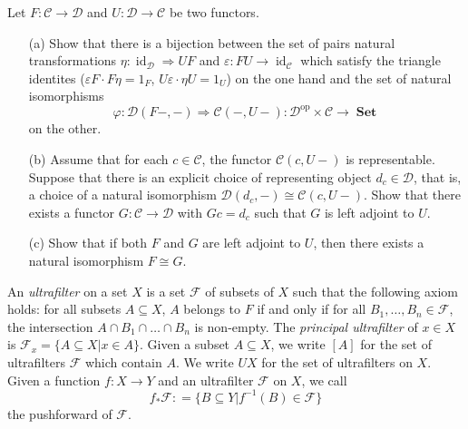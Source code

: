 \documentclass[12pt, a4paper]{article}
\DeclareMathOperator{\id}{id}
\DeclareMathOperator{\op}{op}
\DeclareMathOperator{\Set}{\mathbf{Set}}
\newcommand{\ca}[1]{\mathscr{#1}}
\newcommand{\defl}{\mathrel{\mathop:}=}
\theoremstyle{plain}
\theoremstyle{definition}
\theoremstyle{citing}
\theoremstyle{citingdfn}
\numberwithin{equation}{section}
\begin{document}
\begin{question}[subtitle=(equivalent characterizations of adjunctions)]
 Let $F \colon \ca{C} \rightarrow \ca{D}$ and $U \colon \ca{D} \rightarrow \ca{C}$ be two functors.
 
\begin{enumerate}
\item[(a)] Show that there is a bijection between the set of pairs natural transformations $\eta \colon \id_{\ca{D}} \Rightarrow UF$ and $\varepsilon \colon FU \rightarrow \id_{\ca{C}}$ which satisfy the triangle identites ($\varepsilon F \cdot F\eta=1_F$, $U \varepsilon \cdot \eta U=1_U$) on the one hand and the set of natural isomorphisms
\[
\varphi \colon \ca{D}(F-,-) \Rightarrow \ca{C}(-,U-) \colon \ca{D}^{\op} \times \ca{C} \rightarrow \Set
\]
on the other.
\item[(b)]
 Assume that for each $c \in \ca{C}$, the functor $\ca{C}(c,U-)$ is representable. Suppose that there is an explicit choice of representing object $d_c \in \ca{D}$, that is, a choice of a natural isomorphism $\ca{D}(d_c,-) \cong \ca{C}(c,U-)$. Show that there exists a functor $G \colon \ca{C} \rightarrow \ca{D}$ with $Gc=d_c$ such that $G$ is left adjoint to $U$.

\item[(c)] Show that if both $F$ and $G$ are left adjoint to $U$, then there exists a natural isomorphism $F \cong G$.
\end{enumerate}

\end{question}

\begin{question}[subtitle=(bonus)]
 
\end{question}
 An \emph{ultrafilter} on a set $X$ is a set $\ca{F}$ of subsets of $X$ such that the following axiom holds: for all subsets $A \subseteq X$, $A$ belongs to $F$ if and only if for all $B_1, \ldots, B_n \in \ca{F}$, the intersection $A \cap B_1 \cap \ldots \cap B_n$ is non-empty. The \emph{principal ultrafilter} of $x \in X$ is $\ca{F}_x = \{A \subseteq X \vert x \in A\}$. Given a subset $A \subseteq X$, we write $[A]$ for the set of ultrafilters $\ca{F}$ which contain $A$. We write $UX$ for the set of ultrafilters on $X$. Given a function $f \colon X \rightarrow Y$ and an ultrafilter $\ca{F}$ on $X$, we call
 \[
 f_\ast \ca{F} \defl \{B \subseteq Y \vert f^{-1}(B) \in \ca{F} \}
 \]
  the pushforward of $\ca{F}$.
 
\end{document}
